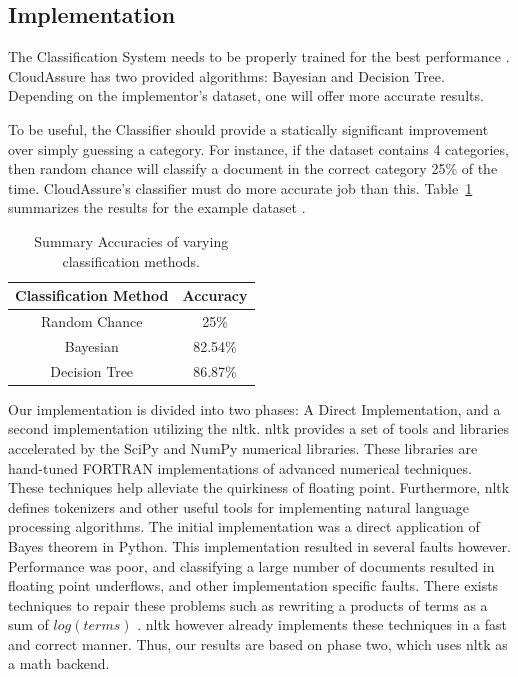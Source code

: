 \subsection{Implementation}
The Classification System
needs to be properly trained for the best performance \autocite{Russell2008}.
CloudAssure has two provided algorithms: Bayesian and Decision Tree.
Depending on the implementor's dataset, one will offer more accurate results.

To be useful, the Classifier should provide a statically significant improvement over simply
guessing a category. For instance, if the dataset contains 4 categories, then
random chance will classify a document in the correct category 25\% of the time.
CloudAssure's classifier must do more accurate job than this.
Table~\ref{tab:classification_accuracy} summarizes the results for the example
dataset \autocite{University}.
\FloatBarrier 
\begin{table}[h!]
    \centering
    \begin{tabular}{c | c }
        \hline
        Classification Method & Accuracy \\
        \hline \hline
        Random Chance & 25\%\\
        Bayesian & 82.54\% \\
        Decision Tree & 86.87\% \\
    \end{tabular}
    \caption{Summary Accuracies of varying classification methods.}
    \label{tab:classification_accuracy}
\end{table}
\FloatBarrier
Our implementation is divided into two phases: A Direct Implementation, and
a second implementation utilizing the \gls{nltk}. \gls{nltk} provides a set of
tools and libraries accelerated by the SciPy and NumPy numerical libraries.
These libraries are hand-tuned FORTRAN implementations of advanced numerical
techniques. These techniques help alleviate the quirkiness of floating point.
Furthermore, \gls{nltk} defines tokenizers and other useful tools for
implementing natural language processing algorithms. The initial implementation was
a direct application of Bayes theorem in Python. This implementation resulted in
several faults however. Performance was poor, and classifying a large number of
documents resulted in floating point underflows, and other implementation
specific faults. There exists techniques to repair these problems such as
rewriting a products  of terms as a sum of \(log(terms) \) \autocite{Graham-Cummings2005}. \gls{nltk} however
already implements these techniques in a fast and correct manner. Thus, our results
are based on phase two, which uses \gls{nltk} as a math backend.\autocite{Denoyer2004}


